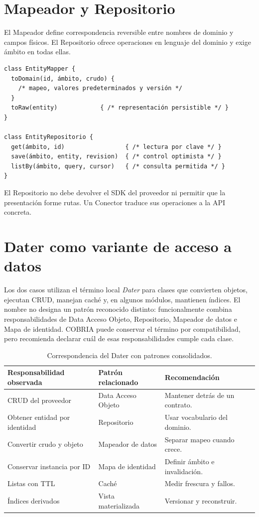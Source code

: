 \section{Mapeador y Repositorio}

El Mapeador define correspondencia reversible entre nombres de dominio y campos físicos.
El Repositorio ofrece operaciones en lenguaje del dominio y exige ámbito en todas ellas.

\begin{verbatim}
class EntityMapper {
  toDomain(id, ámbito, crudo) {
    /* mapeo, valores predeterminados y versión */
  }
  toRaw(entity)            { /* representación persistible */ }
}

class EntityRepositorio {
  get(ámbito, id)                 { /* lectura por clave */ }
  save(ámbito, entity, revision)  { /* control optimista */ }
  listBy(ámbito, query, cursor)   { /* consulta permitida */ }
}
\end{verbatim}

El Repositorio no debe devolver el SDK del proveedor ni permitir que la presentación
forme rutas. Un Conector traduce sus operaciones a la API concreta.

\section{Dater como variante de acceso a datos}

Los dos casos utilizan el término local \emph{Dater} para clases que convierten objetos,
ejecutan CRUD, manejan caché y, en algunos módulos, mantienen índices. El nombre no
designa un patrón reconocido distinto: funcionalmente combina responsabilidades de Data
Acceso Objeto, Repositorio, Mapeador de datos e Mapa de identidad. COBRIA puede conservar el término
por compatibilidad, pero recomienda declarar cuál de esas responsabilidades cumple cada
clase.

\begin{table}[H]
\centering
\caption{Correspondencia del Dater con patrones consolidados.}
\label{tab:dater-patrones}
\begin{tabularx}{\textwidth}{p{3.2cm}p{4cm}X}
\toprule
Responsabilidad observada & Patrón relacionado & Recomendación \\
\midrule
CRUD del proveedor & Data Acceso Objeto & Mantener detrás de un contrato.\\
Obtener entidad por identidad & Repositorio & Usar vocabulario del dominio.\\
Convertir crudo y objeto & Mapeador de datos & Separar mapeo cuando crece.\\
Conservar instancia por ID & Mapa de identidad & Definir ámbito e invalidación.\\
Listas con TTL & Caché & Medir frescura y fallos.\\
Índices derivados & Vista materializada & Versionar y reconstruir.\\
\bottomrule
\end{tabularx}
\end{table}

